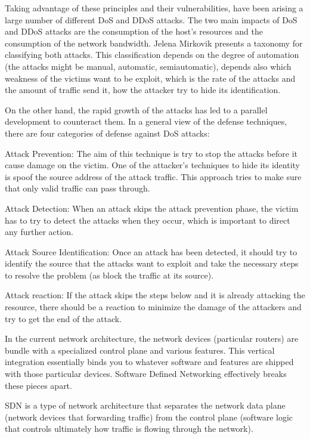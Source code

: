 Taking advantage of these principles and their vulnerabilities, have been arising a large number of different DoS and DDoS attacks. The two main impacts of DoS and DDoS attacks are the consumption of the host's resources and the consumption of the network bandwidth. Jelena Mirkovik presents a taxonomy for classifying both attacks. This classification depends on the degree of automation (the attacks might be manual, automatic, semiautomatic), depends also which weakness of the victims want to be exploit, which is the rate of the attacks and the amount of traffic send it, how the attacker try to hide its identification.

\bigskip

On the other hand, the rapid growth of the attacks has led to a parallel development to counteract them. In a general view of the defense techniques, there are four categories of defense against DoS attacks:

Attack Prevention: The aim of this technique is try to stop the attacks before it cause damage on the victim. One of the attacker's techniques to hide its identity is spoof the source address of the attack traffic. This approach tries to make sure that only valid traffic can pass through.

Attack Detection: When an attack skips the attack prevention phase, the victim has to try to detect the attacks when they occur, which is important to direct any further action.

Attack Source Identification: Once an attack has been detected, it should try to identify the source that the attacks want to exploit and take the necessary steps to resolve the problem (as block the traffic at its source).

Attack reaction: If the attack skips the steps below and it is already attacking the resource, there should be a reaction to minimize the damage of the attackers and try to get the end of the attack. 

In the current network architecture, the network devices (particular routers) are bundle with a specialized control plane and various features. This vertical integration essentially binds you to whatever software and features are shipped with those particular devices. Software Defined Networking effectively breaks these pieces apart.

SDN is a type of network architecture that separates the network data plane (network devices that forwarding traffic) from the control plane (software logic that controls ultimately how traffic is flowing through the network).  

